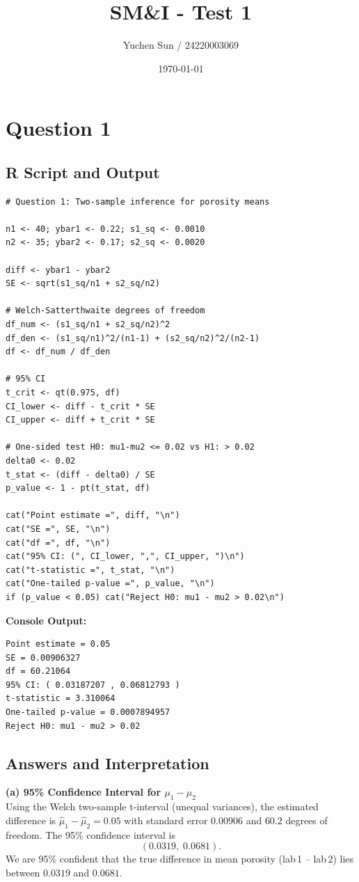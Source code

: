 \documentclass[11pt, a4paper]{article}
\title{\textbf{SM\&I - Test 1}}
\author{Yuchen Sun / 24220003069}
\date{\today}
\begin{document}
\maketitle

\section*{Question 1}

\subsection*{R Script and Output}
\begin{lstlisting}
# Question 1: Two-sample inference for porosity means

n1 <- 40; ybar1 <- 0.22; s1_sq <- 0.0010
n2 <- 35; ybar2 <- 0.17; s2_sq <- 0.0020

diff <- ybar1 - ybar2
SE <- sqrt(s1_sq/n1 + s2_sq/n2)

# Welch-Satterthwaite degrees of freedom
df_num <- (s1_sq/n1 + s2_sq/n2)^2
df_den <- (s1_sq/n1)^2/(n1-1) + (s2_sq/n2)^2/(n2-1)
df <- df_num / df_den

# 95% CI
t_crit <- qt(0.975, df)
CI_lower <- diff - t_crit * SE
CI_upper <- diff + t_crit * SE

# One-sided test H0: mu1-mu2 <= 0.02 vs H1: > 0.02
delta0 <- 0.02
t_stat <- (diff - delta0) / SE
p_value <- 1 - pt(t_stat, df)

cat("Point estimate =", diff, "\n")
cat("SE =", SE, "\n")
cat("df =", df, "\n")
cat("95% CI: (", CI_lower, ",", CI_upper, ")\n")
cat("t-statistic =", t_stat, "\n")
cat("One-tailed p-value =", p_value, "\n")
if (p_value < 0.05) cat("Reject H0: mu1 - mu2 > 0.02\n")
\end{lstlisting}

\textbf{Console Output:}
\begin{lstlisting}
Point estimate = 0.05 
SE = 0.00906327
df = 60.21064 
95% CI: ( 0.03187207 , 0.06812793 )
t-statistic = 3.310064 
One-tailed p-value = 0.0007894957 
Reject H0: mu1 - mu2 > 0.02
\end{lstlisting}

\subsection*{Answers and Interpretation}

\textbf{(a) 95\% Confidence Interval for $\mu_1 - \mu_2$}\\
Using the Welch two-sample t-interval (unequal variances), the estimated difference is $\hat{\mu}_1-\hat{\mu}_2 = 0.05$ with standard error $0.00906$ and $60.2$ degrees of freedom. The 95\% confidence interval is 
\[
(0.0319,\; 0.0681).
\]
We are 95\% confident that the true difference in mean porosity (lab 1 – lab 2) lies between $0.0319$ and $0.0681$.
\end{document}
